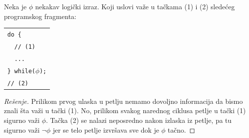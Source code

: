 \begin{EX}
  Neka je $\phi$ nekakav logi\v cki izraz.
  Koji uslovi va\v ze u ta\v ckama (1) i (2) slede\'ceg programskog fragmenta:

\medskip

\begin{tabular}{l}
  \verb"do {"\\
  \verb"  // (1)"\\
  \verb"  ..."\\
  \verb"} while("$\phi$\verb");"\\
  \verb"// (2)"
\end{tabular}
\end{EX}
\begin{proof}[Re\v senje]
  Prilikom prvog ulaska u petlju nemamo dovoljno informacija da bismo znali \v sta va\v zi u ta\v cki (1).
  No, prilikom svakog narednog ciklusa petlje u ta\v cki (1) sigurno va\v zi $\phi$.
  Ta\v cka (2) se nalazi neposredno nakon izlaska iz petlje, pa tu sigurno va\v zi $\lnot\phi$ jer se telo
  petlje izvr\v sava sve dok je $\phi$ ta\v cno.
\end{proof}


